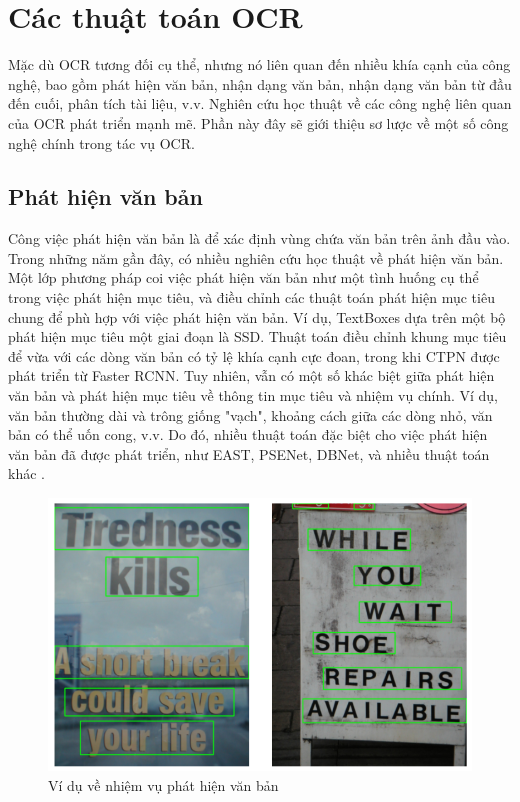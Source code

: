 \section{Các thuật toán OCR}
Mặc dù OCR tương đối cụ thể, nhưng nó liên quan đến nhiều khía cạnh của công nghệ, bao gồm phát hiện văn bản, nhận dạng văn bản, nhận dạng văn bản từ đầu đến cuối, phân tích tài liệu, v.v. Nghiên cứu học thuật về các công nghệ liên quan của OCR phát triển mạnh mẽ. Phần này đây sẽ giới thiệu sơ lược về một số công nghệ chính trong tác vụ OCR.
\subsection{Phát hiện văn bản}
Công việc phát hiện văn bản là để xác định vùng chứa văn bản trên ảnh đầu vào. Trong những năm gần đây, có nhiều nghiên cứu học thuật về phát hiện văn bản. Một lớp phương pháp coi việc phát hiện văn bản như một tình huống cụ thể trong việc phát hiện mục tiêu, và điều chỉnh các thuật toán phát hiện mục tiêu chung để phù hợp với việc phát hiện văn bản. Ví dụ, TextBoxes dựa trên một bộ phát hiện mục tiêu một giai đoạn là SSD. Thuật toán điều chỉnh khung mục tiêu để vừa với các dòng văn bản có tỷ lệ khía cạnh cực đoan, trong khi CTPN được phát triển từ Faster RCNN. Tuy nhiên, vẫn có một số khác biệt giữa phát hiện văn bản và phát hiện mục tiêu về thông tin mục tiêu và nhiệm vụ chính. Ví dụ, văn bản thường dài và trông giống "vạch", khoảng cách giữa các dòng nhỏ, văn bản có thể uốn cong, v.v. Do đó, nhiều thuật toán đặc biệt cho việc phát hiện văn bản đã được phát triển, như EAST, PSENet, DBNet, và nhiều thuật toán khác \cite{Dive-into-ocr-2022}.
\begin{figure}
    \includegraphics[scale=0.7]{images/text-detection.png}
    \centering
    \caption{Ví dụ về nhiệm vụ phát hiện văn bản}
\end{figure}

